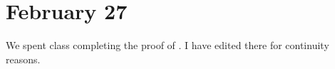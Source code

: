\documentclass[../notes.tex]{subfiles}
\begin{document}
\section{February 27}
We spent class completing the proof of . I have edited there for continuity reasons.
\end{document}
